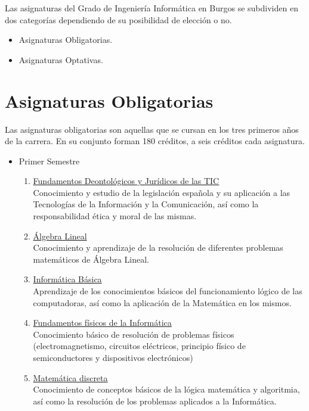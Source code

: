 
Las asignaturas del Grado de Ingeniería Informática en Burgos se subdividen en dos categorías dependiendo de su posibilidad de elección o no. 
\begin{itemize}
\item Asignaturas Obligatorias.
\item Asignaturas Optativas. 
\end{itemize}

\section{Asignaturas Obligatorias}
Las asignaturas obligatorias son aquellas que se cursan en los tres primeros años de la carrera. En su conjunto forman 180 créditos, a seis créditos cada asignatura. 
\begin{itemize}
\item Primer Semestre
\begin{enumerate}
\item \underline{Fundamentos Deontológicos y Jurídicos de las TIC} \\Conocimiento y estudio de la legislación española y su aplicación a las Tecnologías de la Información y la Comunicación, así como la responsabilidad ética y moral de las mismas. 
\item \underline{Álgebra Lineal} \\ Conocimiento y aprendizaje de la resolución de diferentes problemas matemáticos de Álgebra Lineal. 
\item \underline{Informática Básica}\\Aprendizaje de los conocimientos básicos del funcionamiento lógico de las computadoras, así como la aplicación de la Matemática en los mismos.
\item \underline{Fundamentos físicos de la Informática}\\Conocimiento básico de resolución de problemas físicos (electromagnetismo, circuitos eléctricos, principio físico de semiconductores y dispositivos electrónicos)
\item \underline{Matemática discreta}\\Conocimiento de conceptos básicos de la lógica matemática y  algoritmia, así como la resolución de los problemas aplicados a la Informática. 
\end{enumerate}
\end{itemize}

